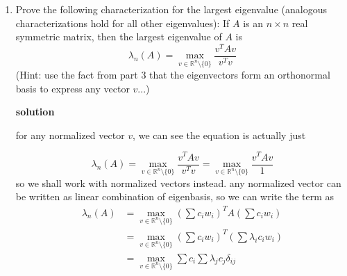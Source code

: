 \documentclass{article}
\newcommand{\sol}{\textbf{solution}}
\begin{document}
\begin{enumerate}
    

    
    Prove:  Let $\lambda_1 \le\ldots \le  \lambda_n$ be the eigenvalues of $A$ with corresponding eigenvectors $u_1,\ldots,u_n$. Then, $A = \sum_{i=1}^n \lambda_iu_iu_i^T$ (note this $u_iu_i^T$ is \textbf{not} the inner product of the vectors and the result is a matrix).

    \sol 

    since the eigenvectors form an orthonormal basis we can represent any vector \(v\) as \(v=\sum c_i  u_i\) where \(u_i\) are the orthonormal eigenbasis vectors. since we know how each one scales, we can represent each \(u_i\) acted on by \(A\) as \(\lambda_i u_i u_i^T c_i u_i = c_i\lambda_i u_i\). doing this term by term in our decomposition of \(v\) shows that \(A\) is indeed 
    \(\sum_{i=1}^n \lambda_iu_iu_i^T\)
    \item Prove the following characterization for the largest eigenvalue (analogous characterizations hold for all other eigenvalues): If $A$ is an $n \times n$ real symmetric matrix, then the largest eigenvalue of $A$ is
    \[
    \lambda_n(A) = \max_{v\in \mathbb{R}^n\setminus\{0\}} \frac{v^TAv}{v^Tv}
    \]
    (Hint: use the fact from part 3 that the eigenvectors form an orthonormal basis to express any vector $v$...)

    \sol

    for any normalized vector \(v\), we can see the equation is actually just 
    
    \begin{equation}
        \lambda_n(A) = \max_{v\in \mathbb{R}^n\setminus\{0\}} \frac{v^TAv}{v^Tv} = \max_{v\in \mathbb{R}^n\setminus\{0\}} \frac{v^TAv}{1} 
    \end{equation}
    so we shall work with normalized vectors instead. any normalized vector can be written as linear combination of eigenbasis, so we can write the term as 
    \begin{equation}
        \begin{split}
            \lambda_n(A) &= \max_{v\in \mathbb{R}^n\setminus\{0\}} \left(\sum c_i w_i\right)^TA \left(\sum c_i w_i\right) \\
            &= \max_{v\in \mathbb{R}^n\setminus\{0\}} \left(\sum c_i w_i\right)^T \left(\sum \lambda_i c_i w_i\right)\\
            &= \max_{v\in \mathbb{R}^n\setminus\{0\}} \sum c_i \sum \lambda_j c_j\delta_{ij}\\
        \end{split}
    \end{equation}


\end{enumerate}
\end{document}
